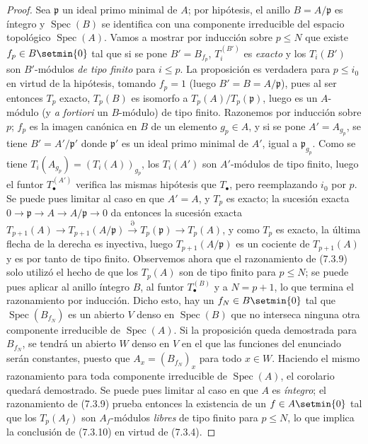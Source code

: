 \documentclass[10pt,oneside,openany]{book}
\theoremstyle{egaenv}\newtheorem*{env}{---}
\theoremstyle{egastatement}
\theoremstyle{egadescription}
\newcommand{\oldpage}[2][]{\marginnote{\normalfont\scriptsize\textbf{#1}\,|\,#2}\ignorespaces}
\renewcommand{\leq}{\leqslant}
\begin{document}
\begin{proof}
Sea $\mathfrak p$ un ideal primo minimal de $A$; por hipótesis, el anillo
$B=A/\mathfrak p$ es íntegro y $\operatorname{Spec}(B)$ se identifica con una
componente irreducible del espacio topológico $\operatorname{Spec}(A)$. Vamos
a mostrar por inducción sobre $p\leq N$ que existe
$f_p\in B\setmin\{0\}$ tal que si se pone $B'=B_{f_p}$, $T_i^{(B')}$ es \emph{exacto} y
los $T_i(B')$ son $B'$-módulos \emph{de tipo finito} para $i\leq p$. La proposición es
verdadera para $p\leq i_0$ en virtud de la hipótesis, tomando $f_p=1$ (luego
$B'=B=A/\mathfrak p$), pues al ser entonces $T_p$ exacto, $T_p(B)$ es isomorfo a
$T_p(A)/T_p(\mathfrak p)$, luego es un $A$-módulo (y \emph{a fortiori} un
$B$-módulo) de tipo finito. Razonemos por inducción sobre $p$; $f_p$ es la imagen
canónica en $B$ de un elemento $g_p\in A$, y si se pone $A'=A_{g_p}$, se tiene
$B'=A'/\mathfrak p'$ donde $\mathfrak p'$ es un ideal primo minimal de $A'$,
igual a $\mathfrak p_{g_p}$. Como se tiene
$T_i(A_{g_p})=(T_i(A))_{g_p}$,
los $T_i(A')$ son $A'$-módulos de tipo finito, luego el funtor
$T_\bullet^{(A')}$ verifica las mismas hipótesis que $T_\bullet$, pero
reemplazando $i_0$ por $p$. Se puede pues limitar al caso en que $A'=A$, y $T_p$
es exacto; la sucesión exacta
$0\longrightarrow\mathfrak p\longrightarrow A\longrightarrow A/\mathfrak p\longrightarrow0$
da entonces la sucesión exacta
$T_{p+1}(A)\longrightarrow T_{p+1}(A/\mathfrak p)\xrightarrow{\partial}T_p(\mathfrak p)\longrightarrow T_p(A)$,
y como $T_p$ es exacto, la última flecha de la derecha es inyectiva, luego
$T_{p+1}(A/\mathfrak p)$ es un cociente de $T_{p+1}(A)$ y es por tanto de
tipo finito. Observemos ahora que el razonamiento de (7.3.9) solo utilizó el hecho
de que los $T_p(A)$ son de tipo finito para $p\leq N$; se puede pues aplicar
al anillo íntegro $B$, al funtor $T_\bullet^{(B)}$ y a $N=p+1$, lo que
termina el razonamiento por inducción. Dicho esto, hay un
$f_N\in B\setmin\{0\}$ tal que $\operatorname{Spec}(B_{f_N})$ es un abierto $V$
denso en $\operatorname{Spec}(B)$ que no interseca ninguna otra
componente irreducible de $\operatorname{Spec}(A)$. Si la proposición queda
\oldpage[III]{185}
demostrada para $B_{f_N}$, se tendrá un abierto $W$ denso en $V$ en
el que las funciones del enunciado serán constantes, puesto que
$A_x=(B_{f_N})_x$ para todo $x\in W$. Haciendo el mismo razonamiento para
toda componente irreducible de $\operatorname{Spec}(A)$, el corolario quedará
demostrado. Se puede pues limitar al caso en que $A$ es \emph{íntegro}; el razonamiento de
(7.3.9) prueba entonces la existencia de un $f\in A\setmin\{0\}$ tal que los $T_p(A_f)$
son $A_f$-módulos \emph{libres} de tipo finito para $p\leq N$, lo que implica
la conclusión de (7.3.10) en virtud de (7.3.4).
\end{proof}
\end{document}
